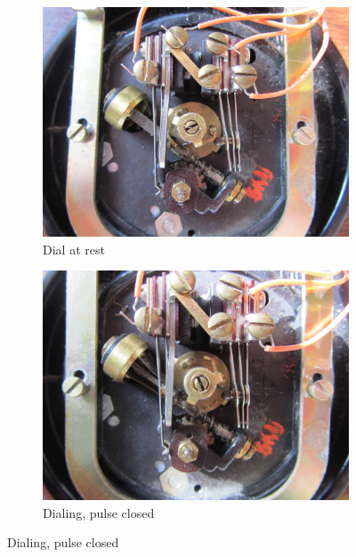 \documentclass{es50report}
\begin{document}
    \begin{figure}
        \centering
        \begin{subfigure}[b]{0.32\textwidth}
                \includegraphics[width=\textwidth, clip=true, trim=300 250 300 70]{images/dialRest}
                \caption{Dial at rest}
                \label{fig:dialRest}
        \end{subfigure}
        \begin{subfigure}[b]{0.32\textwidth}
                \includegraphics[width=\textwidth, clip=true, trim=300 250 300 70]{images/dialIsDialing}
                \caption{Dialing, pulse closed}
                \label{fig:dialIsDialing}
        \end{subfigure}

\end{figure}
\end{document}
